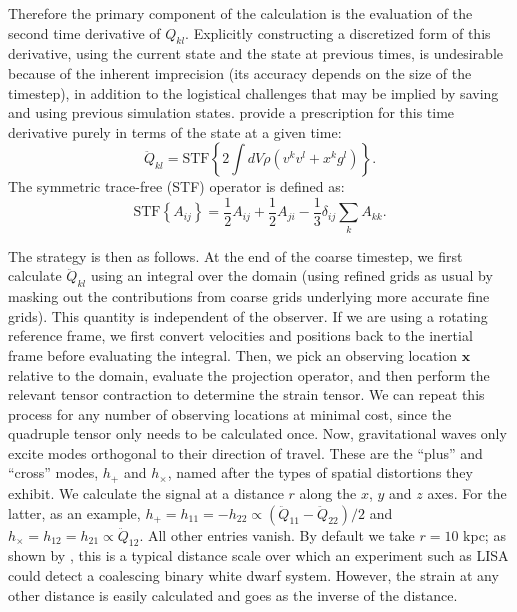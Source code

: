 \documentclass[iop]{../emulateapj}
\begin{document}
Therefore the primary component of the calculation is the evaluation of the second time derivative of $Q_{kl}$.
Explicitly constructing a discretized form of this derivative, using the current state and the state at 
previous times, is undesirable because of the inherent imprecision (its accuracy depends on the size of the timestep),
in addition to the logistical challenges that may be implied by saving and using previous simulation states. 
\citet{blanchet:1990} provide a prescription for this time derivative purely in terms of the state at a given time:
\begin{equation}
  \ddot{Q}_{kl} = \text{STF}\left\{2\int dV \rho (v^k v^l + x^k g^l)\right\}.
\end{equation}
The symmetric trace-free (STF) operator is defined as:
\begin{equation}
  \text{STF}\left\{A_{ij}\right\} = \frac{1}{2}A_{ij} + \frac{1}{2}A_{ji} - \frac{1}{3} \delta_{ij} \sum_{k}A_{kk}.
\end{equation}

The strategy is then as follows. At the end of the coarse timestep, we first calculate $\ddot{Q}_{kl}$
using an integral over the domain (using refined grids as usual by masking out the contributions from 
coarse grids underlying more accurate fine grids). This quantity is independent of the observer. If we 
are using a rotating reference frame, we first convert velocities and positions back to the inertial 
frame before evaluating the integral. Then, 
we pick an observing location $\mathbf{x}$ relative to the domain, evaluate the projection operator, 
and then perform the relevant tensor contraction to determine the strain tensor. We can 
repeat this process for any number of observing locations at minimal cost, since the quadruple tensor 
only needs to be calculated once. Now, gravitational waves only excite modes orthogonal to their 
direction of travel. These are the ``plus'' and ``cross'' modes, $h_+$ and $h_\times$, named after 
the types of spatial distortions they exhibit. We calculate the signal at a distance $r$ along 
the $x$, $y$ and $z$ axes. For the latter, as an example, $h_{+} = h_{11} = -h_{22} \propto (\ddot{Q}_{11} - \ddot{Q}_{22})/2$ and 
$h_{\times} = h_{12} = h_{21} \propto \ddot{Q}_{12}$. All other entries vanish. By default we take $r = 10$ kpc; 
as shown by \citet{loren-aguilar:2005}, this is a typical distance scale over which an 
experiment such as LISA could detect a coalescing binary white dwarf system. 
However, the strain at any other distance is easily calculated and goes as the inverse of the distance.
\end{document}
